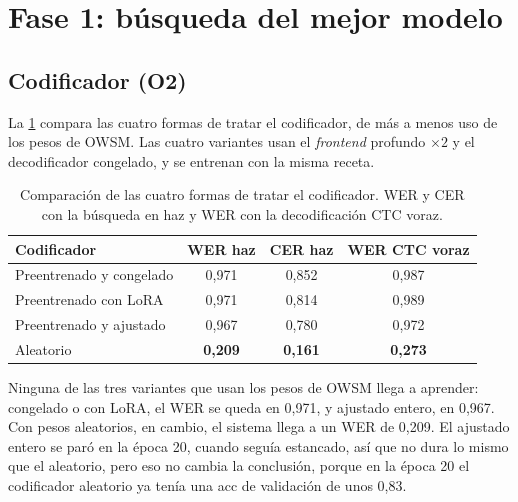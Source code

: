 \section{Fase 1: búsqueda del mejor modelo}
\label{sec:res-fase1}

\subsection{Codificador (O2)}
\label{sec:res-codificador}

La \cref{tab:res-codificador} compara las cuatro formas de tratar el codificador, de más a menos uso de los pesos de OWSM. Las cuatro variantes usan el \textit{frontend} profundo $\times 2$ y el decodificador congelado, y se entrenan con la misma receta.

\begin{table}[htbp]
  \centering
  \caption{Comparación de las cuatro formas de tratar el codificador. WER y CER con la búsqueda en haz y WER con la decodificación CTC voraz.}
  \label{tab:res-codificador}
  \small
  \begin{tabular}{lcc|c}
    \toprule
    \textbf{Codificador} & \textbf{WER haz} & \textbf{CER haz} & \textbf{WER CTC voraz} \\
    \midrule
    Preentrenado y congelado & 0,971          & 0,852          & 0,987 \\
    Preentrenado con LoRA    & 0,971          & 0,814          & 0,989 \\
    Preentrenado y ajustado  & 0,967          & 0,780          & 0,972 \\
    \midrule
    Aleatorio                & \textbf{0,209} & \textbf{0,161} & \textbf{0,273} \\
    \bottomrule
  \end{tabular}
\end{table}

Ninguna de las tres variantes que usan los pesos de OWSM llega a aprender: congelado o con LoRA, el WER se queda en 0,971, y ajustado entero, en 0,967. Con pesos aleatorios, en cambio, el sistema llega a un WER de 0,209. El ajustado entero se paró en la época 20, cuando seguía estancado, así que no dura lo mismo que el aleatorio, pero eso no cambia la conclusión, porque en la época 20 el codificador aleatorio ya tenía una acc de validación de unos 0,83.


